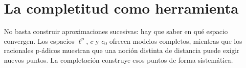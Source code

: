 \section{La completitud como herramienta}
No basta construir aproximaciones sucesivas: hay que saber en qué espacio convergen. Los espacios $\ell^p$, $c$ y $c_0$ ofrecen modelos completos, mientras que los racionales p-ádicos muestran que una noción distinta de distancia puede exigir nuevos puntos. La completación construye esos puntos de forma sistemática.
